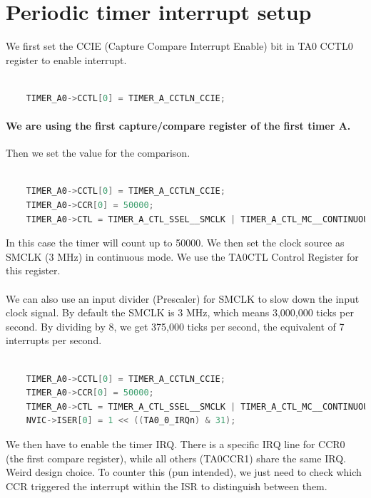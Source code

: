 \section{Periodic timer interrupt setup}

We first set the CCIE (Capture Compare Interrupt Enable) bit in TA0 CCTL0 register to enable interrupt.
\begin{lstlisting}[language=c++]

    TIMER_A0->CCTL[0] = TIMER_A_CCTLN_CCIE;

\end{lstlisting}

\paragraph{We are using the first capture/compare register of the first timer A.}

Then we set the value for the comparison.

\begin{lstlisting}[language=c++]

    TIMER_A0->CCTL[0] = TIMER_A_CCTLN_CCIE;
    TIMER_A0->CCR[0] = 50000;
    TIMER_A0->CTL = TIMER_A_CTL_SSEL__SMCLK | TIMER_A_CTL_MC__CONTINUOUS;
\end{lstlisting}


In this case the timer will count up to 50000.
We then set the clock source as SMCLK (3 MHz) in continuous mode.
We use the TA0CTL Control Register for this register.

\paragraph{}

We can also use an input divider (Prescaler) for SMCLK to slow down the input clock signal.
By default the SMCLK is 3 MHz, which means 3,000,000 ticks per second.
By dividing by 8, we get 375,000 ticks per second, the equivalent of 7 interrupts per second.

\begin{lstlisting}[language=c++]

    TIMER_A0->CCTL[0] = TIMER_A_CCTLN_CCIE;
    TIMER_A0->CCR[0] = 50000;
    TIMER_A0->CTL = TIMER_A_CTL_SSEL__SMCLK | TIMER_A_CTL_MC__CONTINUOUS | TIMER_A_CTL_ID_3;
    NVIC->ISER[0] = 1 << ((TA0_0_IRQn) & 31);
\end{lstlisting}

We then have to enable the timer IRQ.
There is a specific IRQ line for CCR0 (the first compare register), while all others (TA0CCR1) share the
same IRQ. Weird design choice.
To counter this (pun intended), we just need to check which CCR triggered the interrupt within the ISR to
distinguish between them.


